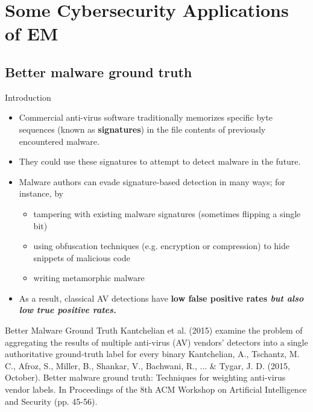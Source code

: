 \documentclass[10pt]{beamer}
\begin{document}
\section{Some Cybersecurity Applications of EM}
\subsection{Better malware ground truth}
\begin{frame}{Introduction}
\begin{itemize}
\item Commercial anti-virus software traditionally memorizes specific byte sequences (known as \textbf{signatures}) in the file contents of previously encountered malware. 
\item They could use these signatures to attempt to detect malware in the future.
\item Malware authors can evade signature-based detection in many ways; for instance, by
	\begin{itemize}
	\item tampering with existing malware signatures (sometimes flipping a single bit)
	\item  using obfuscation techniques (e.g. encryption or compression) to hide snippets of malicious code
	\item writing metamorphic malware
	\end{itemize}
\item As a result, classical AV detections have \bf{low false positive} rates \it{but also} \bf{low true positive} rates.
\end{itemize}
\end{frame}

\begin{frame}{Better Malware Ground Truth}
Kantchelian et al. (2015) examine the problem of aggregating the results of multiple anti-virus (AV) vendors’ detectors into a single authoritative ground-truth label for every binary
\vfill \vfill \vfill
\tiny Kantchelian, A., Tschantz, M. C., Afroz, S., Miller, B., Shankar, V., Bachwani, R., ... \& Tygar, J. D. (2015, October). Better malware ground truth: Techniques for weighting anti-virus vendor labels. In Proceedings of the 8th ACM Workshop on Artificial Intelligence and Security (pp. 45-56).
\end{frame}
\end{document}
